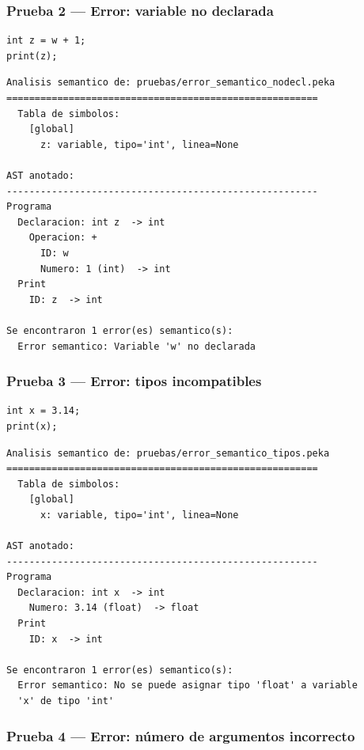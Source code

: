 \documentclass[12pt]{article}
\begin{document}
\subsubsection{Prueba 2 — Error: variable no declarada}

\begin{lstlisting}[caption={error\_semantico\_nodecl.peka}]
int z = w + 1;
print(z);
\end{lstlisting}

\begin{lstlisting}[caption={Salida — Prueba 2}]
Analisis semantico de: pruebas/error_semantico_nodecl.peka
=======================================================
  Tabla de simbolos:
    [global]
      z: variable, tipo='int', linea=None

AST anotado:
-------------------------------------------------------
Programa
  Declaracion: int z  -> int
    Operacion: +
      ID: w
      Numero: 1 (int)  -> int
  Print
    ID: z  -> int

Se encontraron 1 error(es) semantico(s):
  Error semantico: Variable 'w' no declarada
\end{lstlisting}

\subsubsection{Prueba 3 — Error: tipos incompatibles}

\begin{lstlisting}[caption={error\_semantico\_tipos.peka}]
int x = 3.14;
print(x);
\end{lstlisting}

\begin{lstlisting}[caption={Salida — Prueba 3}]
Analisis semantico de: pruebas/error_semantico_tipos.peka
=======================================================
  Tabla de simbolos:
    [global]
      x: variable, tipo='int', linea=None

AST anotado:
-------------------------------------------------------
Programa
  Declaracion: int x  -> int
    Numero: 3.14 (float)  -> float
  Print
    ID: x  -> int

Se encontraron 1 error(es) semantico(s):
  Error semantico: No se puede asignar tipo 'float' a variable
  'x' de tipo 'int'
\end{lstlisting}

\subsubsection{Prueba 4 — Error: número de argumentos incorrecto}
\end{document}
